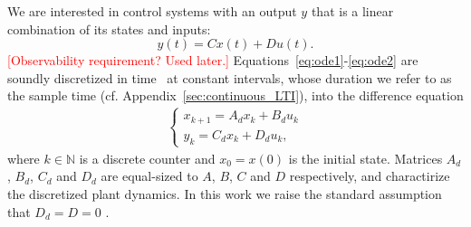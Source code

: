 \documentclass[sigconf]{llncs}
\newcommand{\mat}[1]{{#1}}
\renewcommand{\vec}[1]{{#1}}
\renewcommand{\note}[1]{\textcolor{red}{[#1]}}
\begin{document}
We are interested in control systems with an output $\vec{y}$ that is a linear combination of its states and inputs:
\begin{equation}
\label{eq:ode2}  
\vec{y}(t)=\mat{C}\vec{x}(t)+\mat{D}\vec{u}(t).
\end{equation}
%
\note{Observability requirement? Used later.}
Equations~\eqref{eq:ode1}-\eqref{eq:ode2} are soundly discretized in
time~\cite{middleton1990digital,van1978computing} at constant intervals, whose 
duration we refer to as the sample time (cf. Appendix~\ref{sec:continuous_LTI}), 
into the difference equation 
\begin{align}
\label{eq:plant}
\left\{ 
\begin{array}{l}
\vec{x}_{k+1} = \mat{A}_d \vec{x}_k+ \mat{B}_d \vec{u}_k\\
\vec{y}_{k} = \mat{C}_d \vec{x}_k + \mat{D}_d \vec{u}_k, 
\end{array}
\right.
\end{align} 
%
where $k \in \mathbb N$ is a discrete counter and $\vec{x}_{0}=\vec{x}(0)$ is the initial state. 
Matrices $\mat{A}_d$, $\mat{B}_d$, $\mat{C}_d$ and $\mat{D}_d$ are equal-sized to $\mat{A}$, $\mat{B}$, $\mat{C}$ and $\mat{D}$ respectively,  
and charactirize the discretized plant dynamics. 
In this work we raise the standard assumption that $\mat{D}_d=\mat{D}=\mat{0}$ \cite{Astrom08}.  

\end{document}
